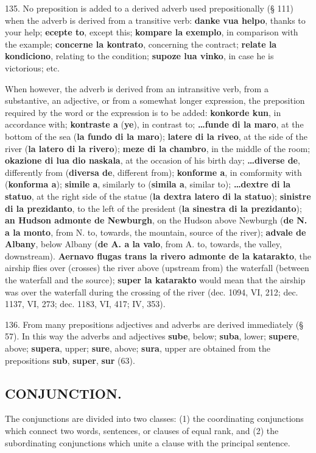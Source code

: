 135. No preposition is added to a derived adverb used prepositionally (§ 111) when the adverb is derived from a transitive verb: \textbf{danke vua helpo}, thanks to your help; \textbf{ecepte to}, except this; \textbf{kompare la exemplo}, in comparison with the example; \textbf{concerne la kontrato}, concerning the contract; \textbf{relate la kondiciono}, relating to the condition; \textbf{supoze lua vinko}, in case he is victorious; etc.

When however, the adverb is derived from an intransitive verb, from a substantive, an adjective, or from a somewhat longer expression, the preposition required by the word or the expression is to be added: \textbf{konkorde kun}, in accordance with; \textbf{kontraste a} (\textbf{ye}), in contrast to; \textbf{\ldots funde di la maro}, at the bottom of the sea (\textbf{la fundo di la maro}); \textbf{latere di la riveo}, at the side of the river (\textbf{la latero di la rivero}); \textbf{meze di la chambro}, in the middle of the room; \textbf{okazione di lua dio naskala}, at the occasion of his birth day; \textbf{\ldots diverse de}, differently from (\textbf{diversa de}, different from); \textbf{konforme a}, in comformity with (\textbf{konforma a}); \textbf{simile a}, similarly to (\textbf{simila a}, similar to); \textbf{\ldots dextre di la statuo}, at the right side of the statue (\textbf{la dextra latero di la statuo}); \textbf{sinistre di la prezidanto}, to the left of the president (\textbf{la sinestra di la prezidanto}); \textbf{an Hudson admonte de Newburgh}, on the Hudson above Newburgh (\textbf{de N. a la monto}, from N. to, towards, the mountain, source of the river); \textbf{advale de Albany}, below Albany (\textbf{de A. a la valo}, from A. to, towards, the valley, downstream). \textbf{Aernavo flugas trans la rivero admonte de la katarakto}, the airship flies over (crosses) the river above (upstream from) the waterfall (between the waterfall and the source); \textbf{super la katarakto} would mean that the airship was over the waterfall during the crossing of the river (dec. 1094, VI, 212; dec. 1137, VI, 273; dec. 1183, VI, 417; IV, 353).

136. From many prepositions adjectives and adverbs are derived immediately (§ 57). In this way the adverbs and adjectives \textbf{sube}, below; \textbf{suba}, lower; \textbf{supere}, above; \textbf{supera}, upper; \textbf{sure}, above; \textbf{sura}, upper are obtained from the prepositions \textbf{sub}, \textbf{super}, \textbf{sur} (63).

\subsection*{CONJUNCTION.}
The conjunctions are divided into two classes: (1) the coordinating conjunctions which connect two words, sentences, or clauses of equal rank, and (2) the subordinating conjunctions which unite a clause with the principal sentence.

